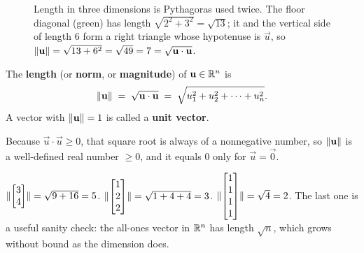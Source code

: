 \begin{figure}[htbp]
\centering
{}
\caption{Length in three dimensions is Pythagoras used twice. The floor diagonal
(green) has length $\sqrt{2^2+3^2}=\sqrt{13}$; it and the vertical side of length $6$
form a right triangle whose hypotenuse is $\vec u$, so
$\lVert\mathbf{u}\rVert=\sqrt{13+6^2}=\sqrt{49}=7=\sqrt{\mathbf{u}\cdot\mathbf{u}}$.}
\label{ch04:pythagoras3d}
\end{figure}

\begin{definition}\label{ch04:norm}
The \textbf{length} (or \textbf{norm}, or \textbf{magnitude}) of
$\mathbf{u}\in\mathbb{R}^n$ is
\[
  \lVert\mathbf{u}\rVert \;=\; \sqrt{\mathbf{u}\cdot\mathbf{u}}
  \;=\; \sqrt{u_1^2 + u_2^2 + \cdots + u_n^2}.
\]
A vector with $\lVert\mathbf{u}\rVert=1$ is called a \textbf{unit vector}.
\end{definition}

Because $\vec u\cdot\vec u \ge 0$, that square root is always of a nonnegative
number, so $\lVert\mathbf{u}\rVert$ is a well-defined real number $\ge 0$, and it equals $0$
only for $\vec u = \vec 0$.

\begin{example}
$\lVert\begin{bmatrix}3\\4\end{bmatrix}\rVert = \sqrt{9+16} = 5$. \quad
$\lVert\begin{bmatrix}1\\2\\2\end{bmatrix}\rVert = \sqrt{1+4+4} = 3$. \quad
$\lVert\begin{bmatrix}1\\1\\1\\1\end{bmatrix}\rVert = \sqrt{4} = 2$.
The last one is a useful sanity check: the all-ones vector in $\mathbb{R}^n$ has length
$\sqrt n$, which grows without bound as the dimension does.
\end{example}

